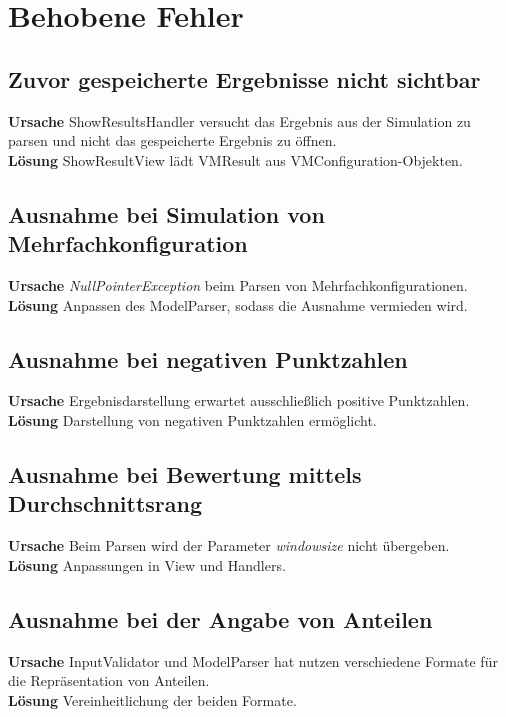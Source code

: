 \section{Behobene Fehler}

\subsection{Zuvor gespeicherte Ergebnisse nicht sichtbar}

\textbf{Ursache} ShowResultsHandler versucht das Ergebnis aus der Simulation zu parsen und nicht das gespeicherte Ergebnis zu öffnen.\\
\textbf{Lösung} ShowResultView lädt VMResult aus VMConfiguration-Objekten.

\subsection{Ausnahme bei Simulation von Mehrfachkonfiguration}

\textbf{Ursache} \emph{NullPointerException} beim Parsen von Mehrfachkonfigurationen.\\
\textbf{Lösung} Anpassen des ModelParser, sodass die Ausnahme vermieden wird.

\subsection{Ausnahme bei negativen Punktzahlen}

\textbf{Ursache} Ergebnisdarstellung erwartet ausschließlich positive Punktzahlen.\\
\textbf{Lösung} Darstellung von negativen Punktzahlen ermöglicht.

\subsection{Ausnahme bei Bewertung mittels Durchschnittsrang}

\textbf{Ursache} Beim Parsen wird der Parameter \emph{windowsize} nicht übergeben.\\
\textbf{Lösung} Anpassungen in View und Handlers.

\subsection{Ausnahme bei der Angabe von Anteilen}

\textbf{Ursache} InputValidator und ModelParser hat nutzen verschiedene Formate für die Repräsentation von Anteilen.\\
\textbf{Lösung} Vereinheitlichung der beiden Formate.

